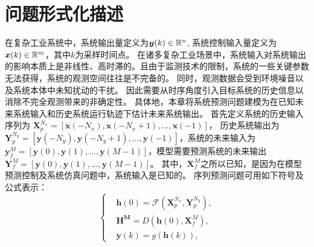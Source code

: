 \section{问题形式化描述}
\label{sec:formulate}
在复杂工业系统中，系统输出量定义为$\boldsymbol y(k) \in \mathbb{R}^n$,
系统控制输入量定义为$\boldsymbol x(k)\in \mathbb{R}^m$，其中$k$为采样时间点。
在诸多复杂工业场景中，系统输入对系统输出的影响本质上是非线性、高时滞的。且由于监测技术的限制，系统的一些关键参数无法获得，系统的观测空间往往是不完备的。
同时，观测数据会受到环境噪音以及系统本体中未知扰动的干扰。
因此需要从时序角度引入目标系统的历史信息以消除不完全观测带来的非确定性。
具体地，本章将系统预测问题建模为在已知未来系统输入和历史系统运行轨迹下估计未来系统输出。
首先定义系统的历史输入序列为 $\boldsymbol X_p^{N_x}=[\boldsymbol x(-N_x),\boldsymbol x(-N_x+1), \dots, \boldsymbol x(-1)]$， 历史系统输出为 
$\boldsymbol Y_p^{N_y}=[\boldsymbol y(-N_y),\boldsymbol y(-N_y+1),\dots, \boldsymbol y(-1)]$，系统的未来输入为 $\boldsymbol y_f^{M}=[\boldsymbol y(0),\boldsymbol y(1),\dots,\boldsymbol y(M-1)]$，模型需要预测系统的未来输出$\boldsymbol Y_f^{M}=[\boldsymbol y(0),\boldsymbol y(1),\dots,\boldsymbol y(M-1)]$。
其中，$\boldsymbol X_f^{M}$之所以已知，是因为在模型预测控制及系统仿真问题中，系统输入是已知的。
序列预测问题可用如下符号及公式表示：
\begin{equation}
\label{equ:discrete_seq2seq}
\left\{
\begin{aligned}
&\boldsymbol{h}(0) = \mathcal{F}(\boldsymbol X_p^{N_x}, \boldsymbol{Y}_p^{N_y}), \\
&\boldsymbol{H^M} = D(\boldsymbol{h}(0), \boldsymbol {X}_f^{M}),\\
&\boldsymbol{y}(k) = g(\boldsymbol{h}(k)),
\end{aligned}
\right.
\end{equation}

